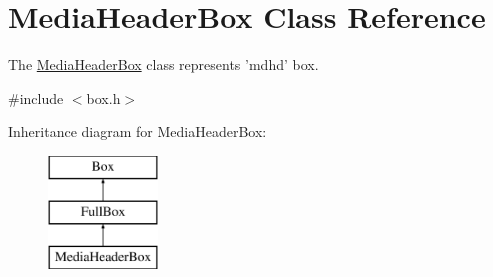 \hypertarget{class_media_header_box}{\section{Media\-Header\-Box Class Reference}
\label{class_media_header_box}
}


The \hyperlink{class_media_header_box}{Media\-Header\-Box} class represents 'mdhd' box.  




{\ttfamily \#include $<$box.\-h$>$}

Inheritance diagram for Media\-Header\-Box\-:\begin{figure}[H]
\begin{center}
\leavevmode
\includegraphics[height=3.000000cm]{class_media_header_box}
\end{center}
\end{figure}
